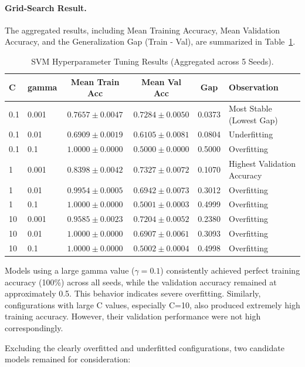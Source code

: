 \documentclass[11pt]{article}
\begin{document}
\paragraph{Grid-Search Result.}
The aggregated results, including Mean Training Accuracy, Mean Validation Accuracy, and the Generalization Gap (Train - Val), are summarized in Table~\ref{tab:gridsearch}.

\begin{table}[H]
  \centering
  \small
  \begin{tabular}{@{}llcccl@{}}
    \toprule
    \textbf{C} & \textbf{gamma} & \textbf{Mean Train Acc} & \textbf{Mean Val Acc} & \textbf{Gap} & \textbf{Observation} \\
    \midrule
    0.1 & 0.001 & $0.7657\pm0.0047$ & $0.7284\pm0.0050$ & 0.0373 & Most Stable (Lowest Gap) \\
    0.1 & 0.01  & $0.6909\pm0.0019$ & $0.6105\pm0.0081$ & 0.0804 & Underfitting \\
    0.1 & 0.1   & $1.0000\pm0.0000$ & $0.5000\pm0.0000$ & 0.5000 & Overfitting \\
    1   & 0.001 & $0.8398\pm0.0042$ & $0.7327\pm0.0072$ & 0.1070 & Highest Validation Accuracy \\
    1   & 0.01  & $0.9954\pm0.0005$ & $0.6942\pm0.0073$ & 0.3012 & Overfitting \\
    1   & 0.1   & $1.0000\pm0.0000$ & $0.5001\pm0.0003$ & 0.4999 & Overfitting \\
    10  & 0.001 & $0.9585\pm0.0023$ & $0.7204\pm0.0052$ & 0.2380 & Overfitting \\
    10  & 0.01  & $1.0000\pm0.0000$ & $0.6907\pm0.0061$ & 0.3093 & Overfitting \\
    10  & 0.1   & $1.0000\pm0.0000$ & $0.5002\pm0.0004$ & 0.4998 & Overfitting \\
    \bottomrule
  \end{tabular}
  \caption{SVM Hyperparameter Tuning Results (Aggregated across 5 Seeds).}
  \label{tab:gridsearch}
\end{table}

Models using a large gamma value ($\gamma=0.1$) consistently achieved perfect training accuracy (100\%) across all seeds, while the validation accuracy remained at approximately 0.5. This behavior indicates severe overfitting. Similarly, configurations with large C values, especially C=10, also produced extremely high training accuracy. However, their validation performance were not high correspondingly. 

Excluding the clearly overfitted and underfitted configurations, two candidate models remained for consideration:
\end{document}
